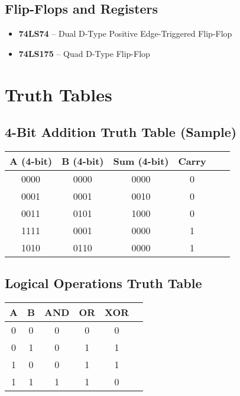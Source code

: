 \subsection{Flip-Flops and Registers}
\begin{itemize}
    \item \textbf{74LS74} -- Dual D-Type Positive Edge-Triggered Flip-Flop
    \item \textbf{74LS175} -- Quad D-Type Flip-Flop
\end{itemize}

\section{Truth Tables}

\subsection{4-Bit Addition Truth Table (Sample)}
\begin{table}[h]
\centering
\begin{tabular}{cccccc}
\toprule
\textbf{A (4-bit)} & \textbf{B (4-bit)} & \textbf{Sum (4-bit)} & \textbf{Carry} \\
\midrule
0000 & 0000 & 0000 & 0 \\
0001 & 0001 & 0010 & 0 \\
0011 & 0101 & 1000 & 0 \\
1111 & 0001 & 0000 & 1 \\
1010 & 0110 & 0000 & 1 \\
\bottomrule
\end{tabular}
\label{tab:addition-truth}
\end{table}

\subsection{Logical Operations Truth Table}
\begin{table}[h]
\centering
\begin{tabular}{cccccc}
\toprule
\textbf{A} & \textbf{B} & \textbf{AND} & \textbf{OR} & \textbf{XOR} \\
\midrule
0 & 0 & 0 & 0 & 0 \\
0 & 1 & 0 & 1 & 1 \\
1 & 0 & 0 & 1 & 1 \\
1 & 1 & 1 & 1 & 0 \\
\bottomrule
\end{tabular}
\label{tab:logic-truth}
\end{table}

